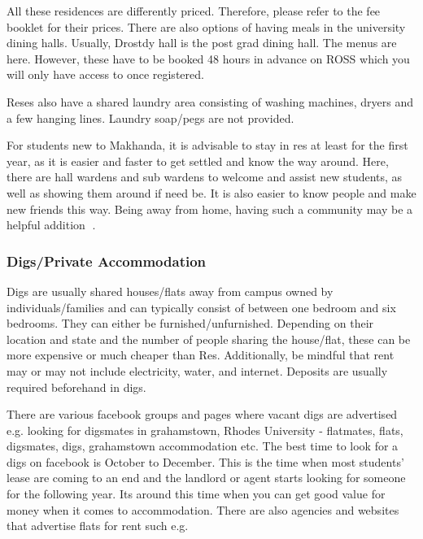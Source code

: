 All these residences are differently priced. Therefore, please refer to the fee booklet for their prices. There are also options of having meals in the university dining halls. Usually, Drostdy hall is the post grad dining hall. The menus are here. However, these have to be booked 48 hours in advance on ROSS which you will only have access to once registered.

Reses also have a shared laundry area consisting of washing machines, dryers and a few hanging lines. Laundry soap/pegs are not provided. 

For students new to Makhanda, it is advisable to stay in res at least for the first year, as it is easier and faster to get settled and know the way around. Here, there are hall wardens and sub wardens to welcome and assist new students, as well as showing them around if need be. It is also easier to know people and make new friends this way. Being away from home, having such a community may be a helpful addition 🙂.

\subsubsection*{Digs/Private Accommodation}
Digs are usually shared houses/flats away from campus owned by individuals/families and can typically consist of between one bedroom and six bedrooms. They can either be furnished/unfurnished. Depending on their location and state and the number of people sharing the house/flat, these can be more expensive or much cheaper than Res. Additionally, be mindful that rent may or may not include electricity, water, and internet. Deposits are usually required beforehand in digs. 

There are various facebook groups and pages where vacant digs are advertised e.g. looking for digsmates in grahamstown, Rhodes University - flatmates, flats, digsmates, digs, grahamstown accommodation etc. The best time to look for a digs on facebook is October to December. This is the time when most students’ lease are coming to an end and the landlord or agent starts looking for someone for the following year. Its around this time when you can get good value for money when it comes to accommodation. There are also agencies and websites that advertise flats for rent such e.g.

